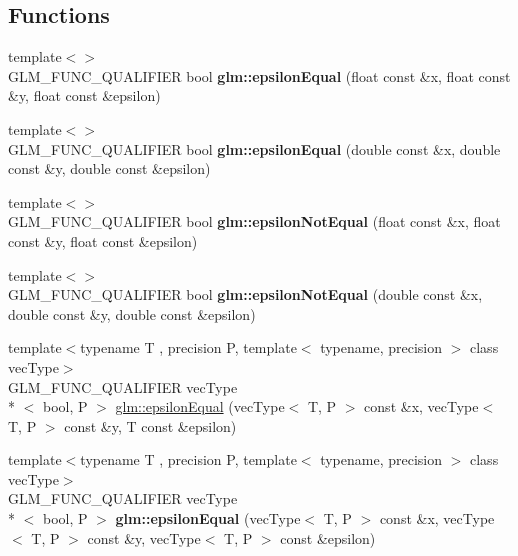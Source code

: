 \subsection*{Functions}
\begin{DoxyCompactItemize}
\item 
\hypertarget{namespaceglm_aded5e7ea9a0eacd03367ad77986c2a15}{{\footnotesize template$<$$>$ }\\G\-L\-M\-\_\-\-F\-U\-N\-C\-\_\-\-Q\-U\-A\-L\-I\-F\-I\-E\-R bool {\bfseries glm\-::epsilon\-Equal} (float const \&x, float const \&y, float const \&epsilon)}\label{namespaceglm_aded5e7ea9a0eacd03367ad77986c2a15}

\item 
\hypertarget{namespaceglm_a6e30ea38a0e3ebc25d87e667255057e5}{{\footnotesize template$<$$>$ }\\G\-L\-M\-\_\-\-F\-U\-N\-C\-\_\-\-Q\-U\-A\-L\-I\-F\-I\-E\-R bool {\bfseries glm\-::epsilon\-Equal} (double const \&x, double const \&y, double const \&epsilon)}\label{namespaceglm_a6e30ea38a0e3ebc25d87e667255057e5}

\item 
\hypertarget{namespaceglm_af4127d65f4afc6e447d461bae25f90fe}{{\footnotesize template$<$$>$ }\\G\-L\-M\-\_\-\-F\-U\-N\-C\-\_\-\-Q\-U\-A\-L\-I\-F\-I\-E\-R bool {\bfseries glm\-::epsilon\-Not\-Equal} (float const \&x, float const \&y, float const \&epsilon)}\label{namespaceglm_af4127d65f4afc6e447d461bae25f90fe}

\item 
\hypertarget{namespaceglm_a68d8ce38812c8599018e404afc79f088}{{\footnotesize template$<$$>$ }\\G\-L\-M\-\_\-\-F\-U\-N\-C\-\_\-\-Q\-U\-A\-L\-I\-F\-I\-E\-R bool {\bfseries glm\-::epsilon\-Not\-Equal} (double const \&x, double const \&y, double const \&epsilon)}\label{namespaceglm_a68d8ce38812c8599018e404afc79f088}

\item 
{\footnotesize template$<$typename T , precision P, template$<$ typename, precision $>$ class vec\-Type$>$ }\\G\-L\-M\-\_\-\-F\-U\-N\-C\-\_\-\-Q\-U\-A\-L\-I\-F\-I\-E\-R vec\-Type\\*
$<$ bool, P $>$ \hyperlink{group__gtc__epsilon_gaca9443f217dc36587624247245522331}{glm\-::epsilon\-Equal} (vec\-Type$<$ T, P $>$ const \&x, vec\-Type$<$ T, P $>$ const \&y, T const \&epsilon)
\item 
\hypertarget{namespaceglm_abc7f87cb473f9c9d7d6109e96c139807}{{\footnotesize template$<$typename T , precision P, template$<$ typename, precision $>$ class vec\-Type$>$ }\\G\-L\-M\-\_\-\-F\-U\-N\-C\-\_\-\-Q\-U\-A\-L\-I\-F\-I\-E\-R vec\-Type\\*
$<$ bool, P $>$ {\bfseries glm\-::epsilon\-Equal} (vec\-Type$<$ T, P $>$ const \&x, vec\-Type$<$ T, P $>$ const \&y, vec\-Type$<$ T, P $>$ const \&epsilon)}\label{namespaceglm_abc7f87cb473f9c9d7d6109e96c139807}


\end{DoxyCompactItemize}
